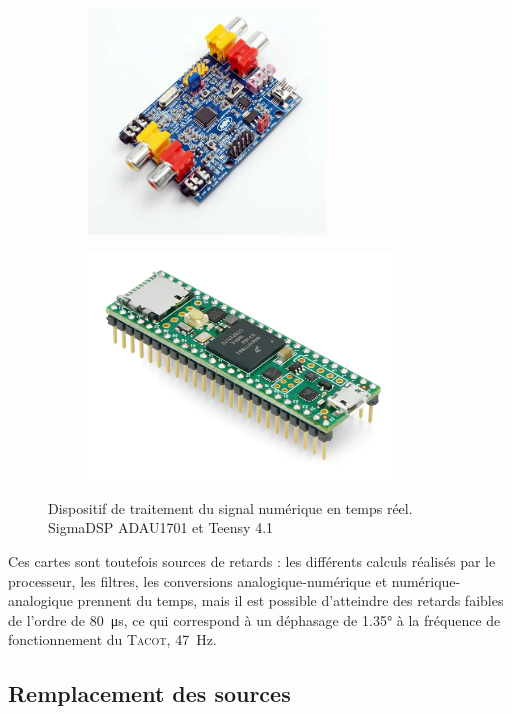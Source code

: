 \begin{figure}[!ht]
    \centering
	\begin{subfigure}{.47\textwidth}
		\centering
		\includegraphics[height=6cm]{../fig/fig_ActiveControl/ADAU1701}
		\caption{}
		\label{fig:ActiveControl_ADAU1701}
	\end{subfigure}		
	\begin{subfigure}{.47\textwidth}
		\centering
		\includegraphics[height=6cm]{../fig/fig_ActiveControl/Teensy41}
		\caption{}
		\label{fig:ActiveControl_Teensy41}
	\end{subfigure}	    
    \caption{Dispositif de traitement du signal numérique en temps réel.  SigmaDSP ADAU1701 et  Teensy 4.1}
    \label{fig:•}
\end{figure}

Ces cartes sont toutefois sources de retards : les différents calculs réalisés par le processeur, les filtres, les conversions analogique-numérique et numérique-analogique prennent du temps, mais il est possible d'atteindre des retards faibles de l'ordre de \qty{80}{\micro\second}, ce qui correspond à un déphasage de \ang{1.35} à la fréquence de fonctionnement du \textsc{Tacot}, \qty{47}{\hertz}.
\subsection{Remplacement des sources}
